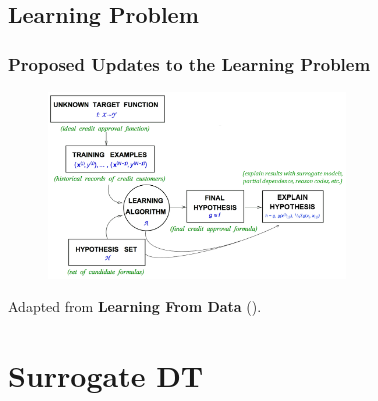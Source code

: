 \documentclass[11pt,
               aspectratio=169
               ]{beamer}
\begin{document}
    \subsection{Learning Problem}
	
		\begin{frame}
		
			\frametitle{Proposed Updates to the Learning Problem}
			
			\begin{figure}[htb]
				\begin{center}
					\includegraphics[height=140pt]{img/learning_problem.png}
					\label{fig:learning_problem}
				\end{center}
			\end{figure}
			
			Adapted from \textbf{Learning From Data} (\cite{lfd}).
			
		\end{frame}

	\section{Surrogate DT}
\end{document}

